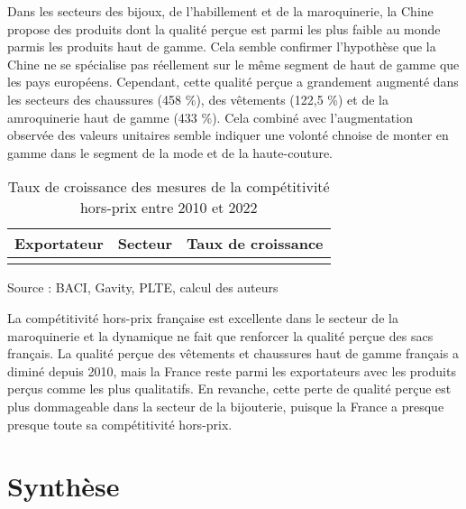 \documentclass[french,10pt,a4paper]{article}
\begin{document}
Dans les secteurs des bijoux, de l'habillement et de la maroquinerie, la Chine propose des produits dont la qualité perçue est parmi les plus faible au monde parmis les produits haut de gamme. Cela semble confirmer l'hypothèse que la Chine ne se spécialise pas réellement sur le même segment de haut de gamme que les pays européens. Cependant, cette qualité perçue a grandement augmenté dans les secteurs des chaussures (458 \%), des vêtements (122,5 \%) et de la amroquinerie haut de gamme (433 \%). Cela combiné avec l'augmentation observée des valeurs unitaires semble indiquer une volonté chnoise de monter en gamme dans le segment de la mode et de la haute-couture. 


\begin{table}[ht]
  \centering
  \begin{tabular}{lrr}
    \hline
   Exportateur & Secteur & Taux de croissance \\
    \hline
    \\
    \hline
  \end{tabular}
  \captionsetup{justification=justified, singlelinecheck=false, font=small}
  \caption*{Source : BACI, Gavity, PLTE, calcul des auteurs}
  \captionsetup{justification=centering, singlelinecheck=true, font=normalsize}
  \caption{Taux de croissance des mesures de la compétitivité hors-prix entre 2010 et 2022}
  \label{tab:taux-croissance-hp}
\end{table}


La compétitivité hors-prix française est excellente dans le secteur de la maroquinerie et la dynamique ne fait que renforcer la qualité perçue des sacs français. La qualité perçue des vêtements et chaussures haut de gamme français a diminé depuis 2010, mais la France reste parmi les exportateurs avec les produits perçus comme les plus qualitatifs. En revanche, cette perte de qualité perçue est plus dommageable dans la secteur de la bijouterie, puisque la France a presque presque toute sa compétitivité hors-prix. 


\section{Synthèse}
\end{document}
